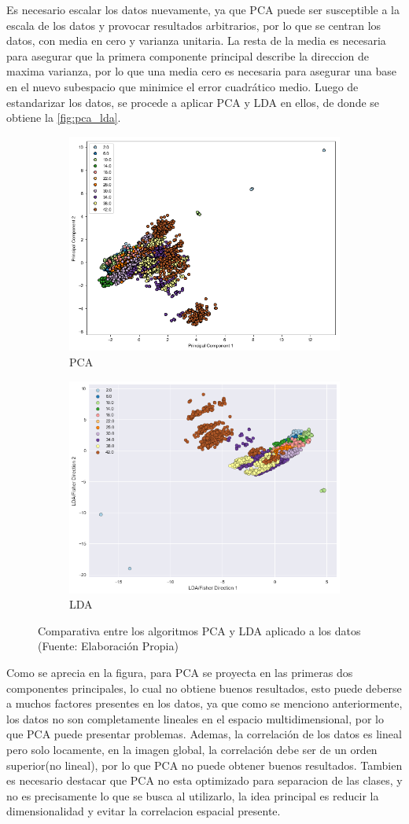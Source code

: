 Es necesario escalar los datos nuevamente, ya que PCA puede ser susceptible a la escala de los datos y provocar resultados arbitrarios, por lo que se centran los datos,  con media en cero y  varianza unitaria. La resta de la media es necesaria para asegurar que la primera componente principal describe la direccion de maxima varianza, por lo que una media cero es necesaria para asegurar una base en el nuevo subespacio que minimice el error cuadrático medio. Luego de estandarizar los datos, se procede a aplicar PCA y LDA en ellos, de donde se obtiene la \autoref{fig:pca_lda}.

\begin{figure}[ht!]
\centering
\begin{subfigure}{.5\textwidth}
  \centering
  \includegraphics[width=.4\linewidth]{figures/pca.png}
  \caption{PCA}
  \label{fig:sub1}
\end{subfigure}%
\begin{subfigure}{.5\textwidth}
  \centering
  \includegraphics[width=.4\linewidth]{figures/lda.png}
  \caption{LDA}
  \label{fig:sub2}
\end{subfigure}
\caption[abs]{Comparativa entre los algoritmos PCA y LDA aplicado a los datos \\
{\scriptsize (Fuente: Elaboración Propia)}}
\label{fig:pca_lda}
\end{figure}

Como se aprecia en la figura, para PCA se proyecta en las primeras dos componentes principales, lo cual no obtiene buenos resultados, esto puede deberse a muchos factores presentes en los datos, ya que como se menciono anteriormente, los datos no son completamente lineales en el espacio multidimensional, por lo que PCA puede presentar problemas. Ademas, la correlación de los datos es lineal pero solo locamente, en la imagen global, la correlación debe ser de un orden superior(no lineal), por lo que PCA no puede obtener buenos resultados. Tambien es necesario destacar que PCA no esta optimizado para separacion de las clases, y no es precisamente lo que se busca al utilizarlo, la idea principal es reducir la dimensionalidad y evitar la correlacion espacial presente. 

